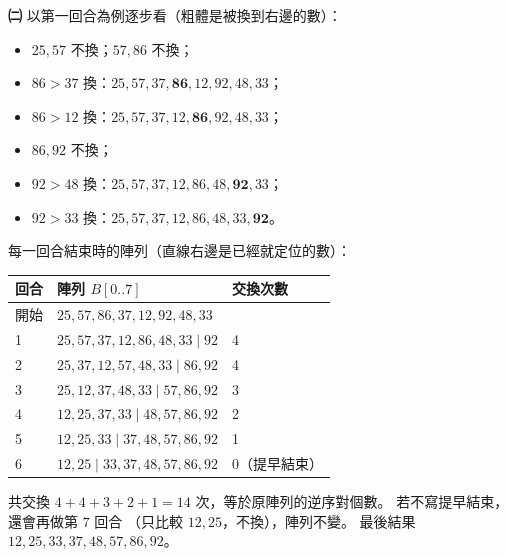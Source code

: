 \begin{pastsoln}
\textbf{㈡} 以第一回合為例逐步看（粗體是被換到右邊的數）：
\begin{itemize}
\item $25, 57$ 不換；$57, 86$ 不換；
\item $86 > 37$ 換：$25, 57, 37, \mathbf{86}, 12, 92, 48, 33$；
\item $86 > 12$ 換：$25, 57, 37, 12, \mathbf{86}, 92, 48, 33$；
\item $86, 92$ 不換；
\item $92 > 48$ 換：$25, 57, 37, 12, 86, 48, \mathbf{92}, 33$；
\item $92 > 33$ 換：$25, 57, 37, 12, 86, 48, 33, \mathbf{92}$。
\end{itemize}
每一回合結束時的陣列（直線右邊是已經就定位的數）：
\begin{center}
\begin{tabular}{lll}
\toprule
回合 & 陣列 $B[0..7]$ & 交換次數 \\
\midrule
開始 & $25, 57, 86, 37, 12, 92, 48, 33$ & \\
1 & $25, 57, 37, 12, 86, 48, 33 \mid 92$ & 4 \\
2 & $25, 37, 12, 57, 48, 33 \mid 86, 92$ & 4 \\
3 & $25, 12, 37, 48, 33 \mid 57, 86, 92$ & 3 \\
4 & $12, 25, 37, 33 \mid 48, 57, 86, 92$ & 2 \\
5 & $12, 25, 33 \mid 37, 48, 57, 86, 92$ & 1 \\
6 & $12, 25 \mid 33, 37, 48, 57, 86, 92$ & 0（提早結束） \\
\bottomrule
\end{tabular}
\end{center}
共交換 $4 + 4 + 3 + 2 + 1 = 14$ 次，等於原陣列的逆序對個數。 若不寫提早結束，還會再做第 $7$ 回合
（只比較 $12, 25$，不換），陣列不變。 最後結果 $12, 25, 33, 37, 48, 57, 86, 92$。
\end{pastsoln}
